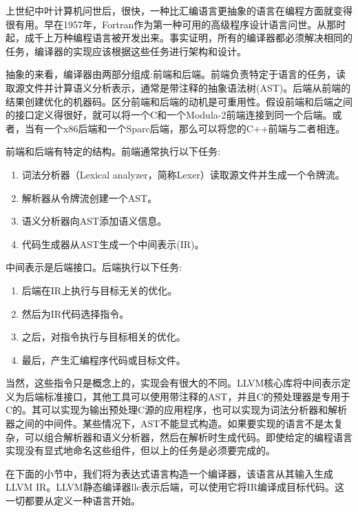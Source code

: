 上世纪中叶计算机问世后，很快，一种比汇编语言更抽象的语言在编程方面就变得很有用。早在1957年，Fortran作为第一种可用的高级程序设计语言问世。从那时起，成千上万种编程语言被开发出来。事实证明，所有的编译器都必须解决相同的任务，编译器的实现应该根据这些任务进行架构和设计。\par

抽象的来看，编译器由两部分组成:前端和后端。前端负责特定于语言的任务，读取源文件并计算语义分析表示，通常是带注释的抽象语法树(AST)。后端从前端的结果创建优化的机器码。区分前端和后端的动机是可重用性。假设前端和后端之间的接口定义得很好，就可以将一个C和一个Modula-2前端连接到同一个后端。或者，当有一个x86后端和一个Sparc后端，那么可以将您的C++前端与二者相连。\par

前端和后端有特定的结构。前端通常执行以下任务:\par

\begin{enumerate}
	\item 词法分析器（Lexical analyzer，简称Lexer）读取源文件并生成一个令牌流。
	\item 解析器从令牌流创建一个AST。
	\item 语义分析器向AST添加语义信息。
	\item 代码生成器从AST生成一个中间表示(IR)。
\end{enumerate}

中间表示是后端接口。后端执行以下任务:\par

\begin{enumerate}
	\item 后端在IR上执行与目标无关的优化。
	\item 然后为IR代码选择指令。
	\item 之后，对指令执行与目标相关的优化。
	\item 最后，产生汇编程序代码或目标文件。
\end{enumerate}

当然，这些指令只是概念上的，实现会有很大的不同。LLVM核心库将中间表示定义为后端标准接口，其他工具可以使用带注释的AST，并且C的预处理器是专用于C的。其可以实现为输出预处理C源的应用程序，也可以实现为词法分析器和解析器之间的中间件。某些情况下，AST不能显式构造。如果要实现的语言不是太复杂，可以组合解析器和语义分析器，然后在解析时生成代码。即使给定的编程语言实现没有显式地命名这些组件，但以上的任务是必须要完成的。\par

在下面的小节中，我们将为表达式语言构造一个编译器，该语言从其输入生成LLVM IR。LLVM静态编译器llc表示后端，可以使用它将IR编译成目标代码。这一切都要从定义一种语言开始。\par






















